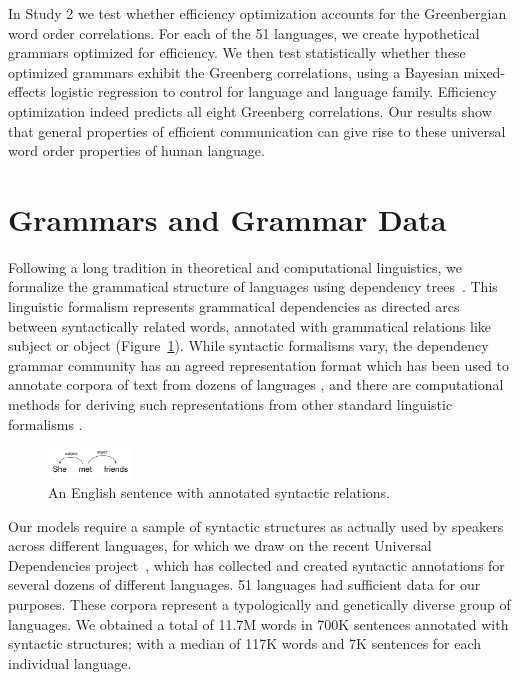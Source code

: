 \documentclass[9pt,twocolumn,twoside,lineno]{pnas-new}
\begin{document}
In Study 2 we test whether efficiency optimization accounts for the Greenbergian word order correlations.  For each of the 51 languages, we create hypothetical grammars optimized for efficiency.  We then test statistically whether these optimized grammars exhibit the Greenberg correlations, using a Bayesian mixed-effects logistic regression to control for language and language family.  Efficiency optimization indeed predicts all eight Greenberg correlations.
Our results show that general properties of efficient communication can give rise to these universal word order properties of human language.



\section*{Grammars and Grammar Data}

Following a long tradition in theoretical and computational linguistics, we formalize  the grammatical structure of languages using dependency trees~\cite{hays1964dependency,hudson1984word,melcuk1988dependency,corbett1993heads,tesniere2015elements}.
This linguistic formalism represents grammatical dependencies as directed arcs between syntactically related words, annotated with grammatical relations like subject or object (Figure~\ref{fig:sent-dep}).
While syntactic formalisms vary, the dependency grammar community has an agreed representation format  which has been used to  annotate corpora of text from dozens of languages \cite{ud2.1}, and there are 
computational methods for deriving such representations from other standard linguistic formalisms \cite{boston2009dependency}.

\begin{figure}[ht]
    \centering
    \includegraphics[width=0.2\textwidth]{figure2.pdf}
	\caption{An English sentence with annotated syntactic relations.}
	\label{fig:sent-dep}
\end{figure}

Our models require a sample of syntactic structures as actually used by speakers across different languages, for which we draw on the recent
Universal Dependencies project~\cite{ud2.1}, which has collected and created syntactic annotations for several dozens of different languages.
51 languages had sufficient data for our purposes. 
These corpora represent a typologically and genetically diverse group of languages. %
We obtained a total of 11.7M words in 700K sentences annotated with syntactic structures; with a median of 117K words and 7K sentences for each individual language.
\end{document}
